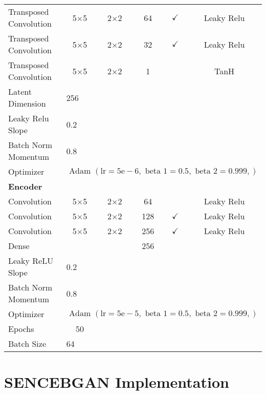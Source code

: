 \begin{longtable}[c]{@{}lccccc@{}}
	Transposed Convolution & \multicolumn{1}{c}{5$\times$5} & 2$\times$2 & 64 & $\checkmark$ & Leaky Relu \\
	Transposed Convolution & \multicolumn{1}{c}{5$\times$5} & 2$\times$2 & 32 & $\checkmark$ & Leaky Relu \\
	Transposed Convolution & \multicolumn{1}{c}{5$\times$5} & 2$\times$2 & 1 &  & TanH\\
	Latent Dimension & \multicolumn{5}{l}{256} \\
	Leaky Relu Slope & \multicolumn{5}{l}{0.2} \\
	Batch Norm Momentum & \multicolumn{5}{l}{0.8} \\
	Optimizer & \multicolumn{5}{l}{$\text { Adam }(\mathrm{lr}=5 \mathrm{e}-6, \text { beta } 1=0.5, \text { beta } 2=0.999,)$} \\ \hline
	\multicolumn{6}{l}{\textbf{Encoder}} \\
	Convolution & \multicolumn{1}{c}{5$\times$5} & 2$\times$2 & 64 &  & Leaky Relu \\
	Convolution & \multicolumn{1}{c}{5$\times$5} & 2$\times$2 & 128 & $\checkmark$ & Leaky Relu \\
	Convolution & \multicolumn{1}{c}{5$\times$5} & 2$\times$2 & 256 & $\checkmark$ & Leaky Relu \\
	Dense & \multicolumn{1}{c}{} &  & 256 &  &  \\ 
	Leaky ReLU Slope & \multicolumn{5}{l}{0.2} \\
	Batch Norm Momentum & \multicolumn{5}{l}{0.8} \\
	Optimizer & \multicolumn{5}{l}{$\text { Adam }(\mathrm{lr}=5 \mathrm{e}-5, \text { beta } 1=0.5, \text { beta } 2=0.999,)$} \\ \hline
	Epochs & 50 & \multicolumn{1}{l}{} & \multicolumn{1}{l}{} & \multicolumn{1}{l}{} & \multicolumn{1}{l}{} \\
	Batch Size & \multicolumn{5}{l}{64}
		
\end{longtable}

\section{SENCEBGAN Implementation}

